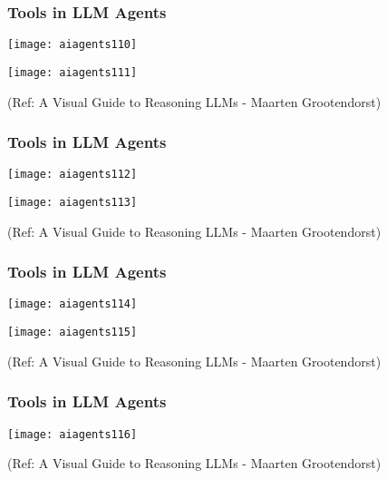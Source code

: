 \begin{frame}[fragile]\frametitle{Tools in LLM Agents}

        \begin{center}
        \texttt{[image: aiagents110]}

        \texttt{[image: aiagents111]}
		

        {\tiny (Ref: A Visual Guide to Reasoning LLMs - Maarten Grootendorst)}
        \end{center}


\end{frame}

\begin{frame}[fragile]\frametitle{Tools in LLM Agents}

        \begin{center}
		
        \texttt{[image: aiagents112]}

		\texttt{[image: aiagents113]}

        {\tiny (Ref: A Visual Guide to Reasoning LLMs - Maarten Grootendorst)}
        \end{center}


\end{frame}

\begin{frame}[fragile]\frametitle{Tools in LLM Agents}

        \begin{center}
		
        \texttt{[image: aiagents114]}

		\texttt{[image: aiagents115]}
		
	

        {\tiny (Ref: A Visual Guide to Reasoning LLMs - Maarten Grootendorst)}
        \end{center}


\end{frame}

\begin{frame}[fragile]\frametitle{Tools in LLM Agents}

        \begin{center}
		
		
		\texttt{[image: aiagents116]}
		

        {\tiny (Ref: A Visual Guide to Reasoning LLMs - Maarten Grootendorst)}
        \end{center}


\end{frame}


